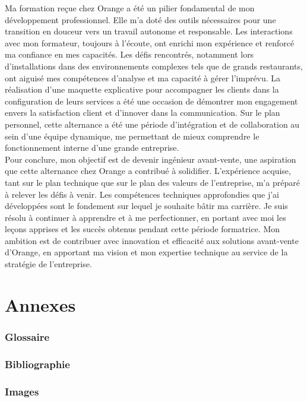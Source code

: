 \documentclass[12pt, a4paper]{article}
\begin{document}
Ma formation reçue chez Orange a été un pilier fondamental de mon
développement professionnel. Elle m'a doté des outils nécessaires
pour une transition en douceur vers un travail autonome et responsable.
Les interactions avec mon formateur, toujours à l'écoute, ont enrichi
mon expérience et renforcé ma confiance en mes capacités. Les défis
rencontrés, notamment lors d'installations 
dans des environnements complexes tels que de grands restaurants,
ont aiguisé mes compétences d'analyse et ma capacité à gérer l'imprévu.
La réalisation d'une maquette explicative pour accompagner les clients
dans la configuration de leurs services a été une occasion de démontrer
mon engagement envers la satisfaction client et d'innover dans la
communication. Sur le plan personnel, cette alternance a
été une période d'intégration et de collaboration au sein d'une équipe
dynamique, me permettant de mieux comprendre le fonctionnement interne
d'une grande entreprise.\\

Pour conclure, mon objectif est de devenir ingénieur avant-vente,
une aspiration que cette alternance chez Orange a contribué à solidifier.
L'expérience acquise, tant sur le plan technique que sur le plan des valeurs
de l'entreprise, m'a préparé à relever les défis à venir. Les compétences
techniques approfondies que j'ai développées sont le fondement sur lequel
je souhaite bâtir ma carrière. Je suis résolu à continuer à apprendre et à
me perfectionner, en portant avec moi les leçons apprises et les succès
obtenus pendant cette période formatrice. Mon ambition est de contribuer
avec innovation et efficacité aux solutions avant-vente d'Orange, en
apportant ma vision et mon expertise technique au service de la stratégie
de l'entreprise.
\newpage
\pagestyle{empty}
\appendix
\part{\Large{Annexes}}
\newpage
\parttoc 


\newpage
\pagestyle{fancy}
\section{Glossaire}

\section{Bibliographie}

\section{Images}
\end{document}
